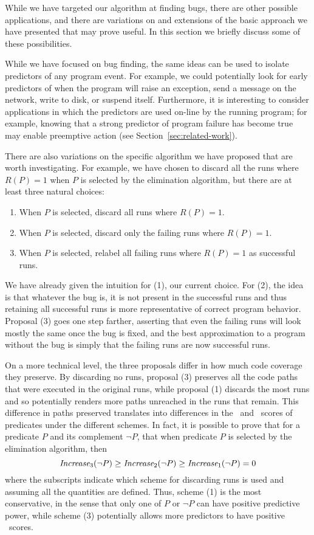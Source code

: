 


While we have targeted our algorithm at finding bugs, there are other
possible applications, and there are variations
on and extensions of the basic approach we have presented that may
prove useful.  In this section we briefly discuss some of these
possibilities.

While we have focused on bug finding, the same ideas
can be used to isolate predictors of any program event.  For example,
we could potentially look for early predictors of when the program
will raise an exception, send a message on the network, write to disk,
or suspend itself.  Furthermore, it is interesting to consider
applications in which the predictors are used on-line by the running
program; for example, knowing that a strong predictor of program
failure has become true may enable preemptive action (see
Section~\ref{sec:related-work}).

There are also variations on the specific algorithm we have proposed
that are worth investigating.  For example, we have chosen to discard
all the runs where $R(P) = 1$ when $P$ is selected by the
elimination algorithm, but there are at least three natural choices:
\begin{enumerate}
\item When $P$ is selected, discard all runs where $R(P) = 1$.

\item When $P$ is selected, discard only the failing runs where $R(P) = 1$.

\item When $P$ is selected, relabel all failing runs where $R(P) = 1$ as successful runs.
\end{enumerate}

We have already given the intuition for (1), our current choice.  For
(2), the idea is that whatever the bug is, it is not present in the
successful runs and thus retaining all successful runs is more
representative of correct program behavior.  Proposal (3) goes one step
farther, asserting that even the failing runs will look mostly the same
once the bug is fixed, and the best approximation to a program without the
bug is simply that the failing runs are now successful runs.

On a more technical level, the three proposals differ in how much code
coverage they preserve.  By discarding no runs, proposal (3) preserves
all the code paths that were executed in the original
runs, while proposal (1) discards the most runs and so
potentially renders more paths unreached in the runs that
remain.  This difference in paths preserved translates into differences
in the \crash\ and \context\ scores of predicates under the different schemes.
In fact, it is possible to prove that for a predicate $P$ and its complement
$\neg P$, that when predicate $P$ is selected by the elimination algorithm,
then 
\[ \textit{Increase}_3(\neg P) \geq \textit{Increase}_2(\neg P) \geq \textit{Increase}_1(\neg P) = 0 \]
where the subscripts indicate which scheme for discarding runs is used and
assuming all the quantities are defined.
Thus, scheme (1) is the most conservative, in the sense that only one of $P$
or $\neg P$ can have positive predictive power, while scheme (3) potentially allows more predictors to have positive \increase\ scores.


